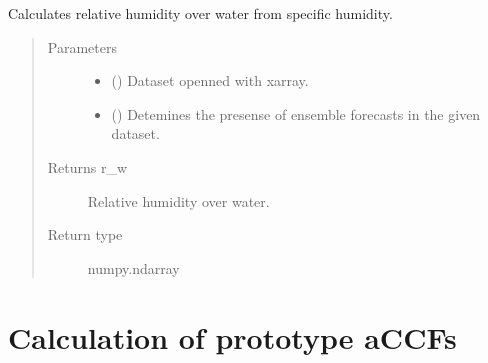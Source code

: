 \documentclass[a4paper,11pt,english]{sphinxmanual}
\begin{document}
\begin{fulllineitems}
\label{\detokenize{modules:envlib.contrail.get_rw_from_specific_hum}}
Calculates relative humidity over water from specific humidity.
\begin{quote}\begin{description}
\item[{Parameters}] \leavevmode\begin{itemize}
\item {} 
 () \textendash{} Dataset openned with xarray.

\item {} 
 () \textendash{} Detemines the presense of ensemble forecasts in the given dataset.

\end{itemize}

\item[{Returns r\_w}] \leavevmode
Relative humidity over water.

\item[{Return type}] \leavevmode
numpy.ndarray

\end{description}\end{quote}

\end{fulllineitems}



\section{Calculation of prototype aCCFs}
\label{\detokenize{modules:calculation-of-prototype-accfs}}
\end{document}
